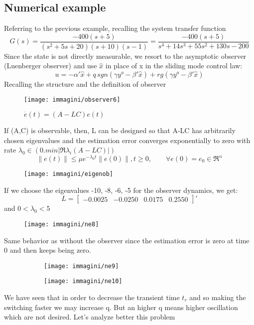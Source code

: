 \subsection{Numerical example}
Referring to the previous example, recalling the system transfer function 
\[
G(s)=\frac{-400(s+5)}{(s^2+5s+20)(s+10)(s-1)}=\frac{-400(s+5)}{s^4+14s^3+55s^2+130s-200}
\]Since the state is not directly measurable, we resort to the asymptotic observer (Luenberger observer) and use $\hat{x}$ in place of x in the sliding mode control law:
\[
u=-\alpha'\hat{x}+q\,sgn(\gamma y°-\beta'\hat{x})+rg(\gamma y°-\beta' \hat{x})
\]
Recalling the structure and the definition of observer
\begin{figure}[H]
	\centering
	\texttt{[image: immagini/observer6]}
	\caption{$\dot{e}(t)=(A-LC)e(t)$}
	\label{fig:observer6}
\end{figure}
If (A,C) is observable, then, L can be designed so that A-LC has arbitrarily chosen eigenvalues and
the estimation error converges exponentially to zero with rate $\lambda_0\in(0.min|\Re{\lambda_i(A-LC)}|)$
\[\|e(t)\|\le\mu e^{-\lambda_0t}\|e(0)\|,t\ge0,\qquad \forall e(0)=e_0\in \Re^n\]
\begin{figure}[H]
	\centering
	\texttt{[image: immagini/eigenob]}
	\label{fig:eigenob}
\end{figure}
If we choose the eigenvalues -10, -8, -6, -5 for the observer dynamics, we get: \[
L=\begin{bmatrix}
	-0.0025 & -0.0250 & 0.0175 & 0.2550
\end{bmatrix}'
\] and $0<\lambda_0<5$ 
\begin{figure}[H]
	\centering
	\texttt{[image: immagini/ne8]}
	\caption{}
	\label{fig:ne8}
\end{figure}
Same behavior as without the observer since the estimation error is zero at time 0 and then keeps being zero.
\begin{figure}[H]
	\centering
	\begin{subfigure}[b]{0.3\textwidth}
		\centering
		\texttt{[image: immagini/ne9]}
		\label{fig:ne9}
	\end{subfigure}
	\hfill
	\begin{subfigure}[b]{0.3\textwidth}
		\centering
		\texttt{[image: immagini/ne10]}
		\label{fig:ne10}
	\end{subfigure}
	\hfill
\end{figure}
We have seen that in order to decrease the transient time $t_r$ and so making the switching faster we may increase q. But an higher q means higher oscillation which are not desired. Let's analyze better this problem
